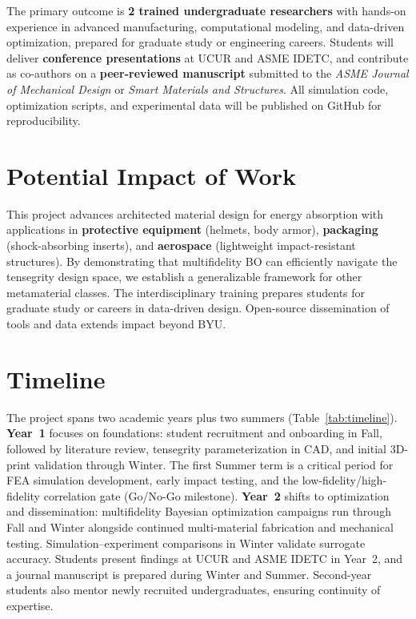 \documentclass[11pt]{article}
\begin{document}
The primary outcome is \textbf{2 trained undergraduate researchers} with
hands-on experience in advanced manufacturing, computational modeling, and
data-driven optimization, prepared for graduate study or engineering careers.
Students will deliver \textbf{conference presentations} at UCUR and ASME IDETC,
and contribute as co-authors on a \textbf{peer-reviewed manuscript} submitted to
the \emph{ASME Journal of Mechanical Design} or \emph{Smart Materials and
Structures}.  All simulation code, optimization scripts, and experimental data
will be published on GitHub for reproducibility.

\section{Potential Impact of Work}

This project advances architected material design for energy absorption with
applications in \textbf{protective equipment} (helmets, body armor),
\textbf{packaging} (shock-absorbing inserts), and \textbf{aerospace}
(lightweight impact-resistant structures).  By demonstrating that multifidelity
BO can efficiently navigate the tensegrity design space, we establish a
generalizable framework for other metamaterial classes.
The interdisciplinary training prepares students for graduate study or careers
in data-driven design.  Open-source dissemination of tools and data extends
impact beyond BYU.

\section{Timeline}

The project spans two academic years plus two summers (Table~\ref{tab:timeline}).
\textbf{Year~1} focuses on foundations: student recruitment and onboarding in
Fall, followed by literature review, tensegrity parameterization in CAD, and
initial 3D-print validation through Winter.  The first Summer term is a
critical period for FEA simulation development, early impact testing, and the
low-fidelity/high-fidelity correlation gate (Go/No-Go milestone).
\textbf{Year~2} shifts to optimization and dissemination: multifidelity
Bayesian optimization campaigns run through Fall and Winter alongside continued
multi-material fabrication and mechanical testing.  Simulation--experiment
comparisons in Winter validate surrogate accuracy.  Students present findings
at UCUR and ASME IDETC in Year~2, and a journal manuscript is prepared during
Winter and Summer.  Second-year students also mentor newly recruited
undergraduates, ensuring continuity of expertise.
\end{document}
